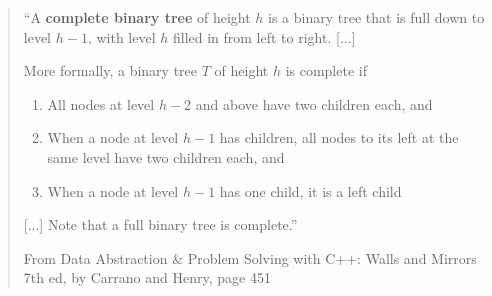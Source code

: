 \documentclass[a4paper,12pt,oneside]{book}
\begin{document}
    \begin{quote}
        ``A \textbf{complete binary tree} of height $h$ is a binary tree that is full down to level $h-1$, with level $h$
        filled in from left to right. [...]

        More formally, a binary tree $T$ of height $h$ is complete if

        \begin{enumerate}
            \item   All nodes at level $h-2$ and above have two children each, and
            \item   When a node at level $h-1$ has children, all nodes to its left at the same level have two children each, and
            \item   When a node at level $h-1$ has one child, it is a left child
        \end{enumerate}

        [...] Note that a full binary tree is complete.''
        
        \footnotesize
        From Data Abstraction \& Problem Solving with C++: Walls and Mirrors 7th ed, by Carrano and Henry, page 451
    \end{quote}
    
\end{document}
